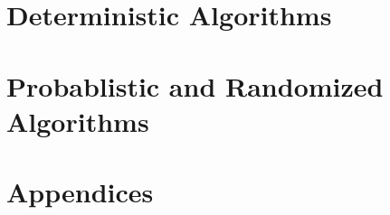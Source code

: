 \documentclass[11pt]{book}
\title{\Title}
\date{}
\author{\Authors}
\theoremstyle{definition}
\begin{document}
\maketitle
\tableofcontents

\part{Deterministic Algorithms}
\begin{multicols}{2}
\end{multicols}

\part{Probablistic and Randomized Algorithms}
\begin{multicols}{2}
  
  
  
\end{multicols}

\part{Appendices}
  \appendix

\end{document}

